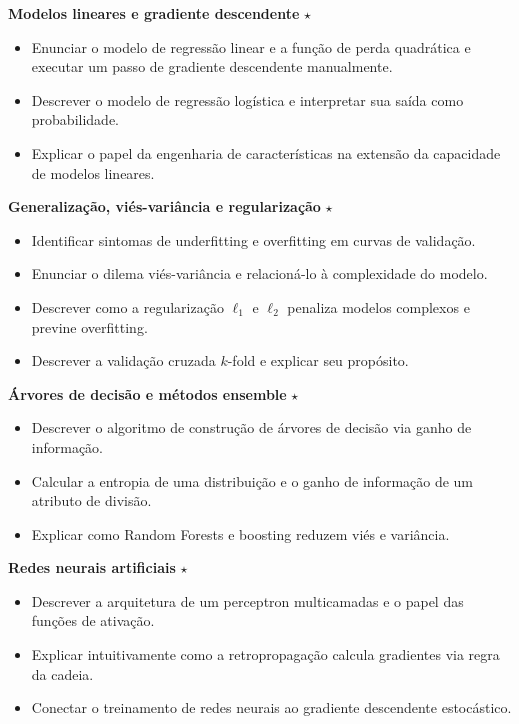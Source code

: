 \documentclass[12pt,a4paper]{article}
\begin{document}
\noindent\textbf{Modelos lineares e gradiente descendente} $\star$
\begin{itemize}
    \item Enunciar o modelo de regressão linear e a função de perda quadrática e executar um passo de gradiente descendente manualmente.
    \item Descrever o modelo de regressão logística e interpretar sua saída como probabilidade.
    \item Explicar o papel da engenharia de características na extensão da capacidade de modelos lineares.
\end{itemize}

\noindent\textbf{Generalização, viés-variância e regularização} $\star$
\begin{itemize}
    \item Identificar sintomas de underfitting e overfitting em curvas de validação.
    \item Enunciar o dilema viés-variância e relacioná-lo à complexidade do modelo.
    \item Descrever como a regularização $\ell_1$ e $\ell_2$ penaliza modelos complexos e previne overfitting.
    \item Descrever a validação cruzada $k$-fold e explicar seu propósito.
\end{itemize}

\noindent\textbf{Árvores de decisão e métodos ensemble} $\star$
\begin{itemize}
    \item Descrever o algoritmo de construção de árvores de decisão via ganho de informação.
    \item Calcular a entropia de uma distribuição e o ganho de informação de um atributo de divisão.
    \item Explicar como Random Forests e boosting reduzem viés e variância.
\end{itemize}

\noindent\textbf{Redes neurais artificiais} $\star$
\begin{itemize}
    \item Descrever a arquitetura de um perceptron multicamadas e o papel das funções de ativação.
    \item Explicar intuitivamente como a retropropagação calcula gradientes via regra da cadeia.
    \item Conectar o treinamento de redes neurais ao gradiente descendente estocástico.
\end{itemize}
\end{document}
